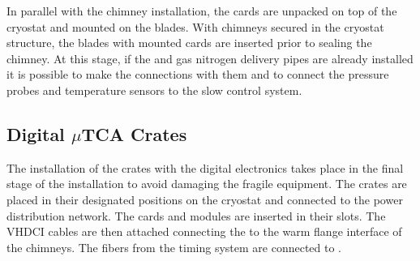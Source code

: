 In parallel with the chimney installation, the  cards are unpacked on top of the cryostat and mounted on the blades.  
With  chimneys secured in the cryostat structure, the blades with mounted  cards %
are inserted prior to sealing the chimney.
At this stage, if the \lar and gas nitrogen delivery pipes are already installed  it is possible to make the connections with them and to connect the pressure probes and temperature sensors to the slow control system.
 
 
\subsection{Digital $\mu$TCA Crates}
\label{sec:fddp-tpc-elec-install-utca}

The installation of the  crates with the digital electronics %
takes place in the final stage of the  installation to avoid damaging the fragile equipment. The crates are placed in their designated positions on the cryostat and connected to the power distribution network. The  cards and  modules are inserted in their slots. The VHDCI cables are then attached connecting the   to the warm flange interface of the  chimneys.  The fibers from the timing system are connected to . 



